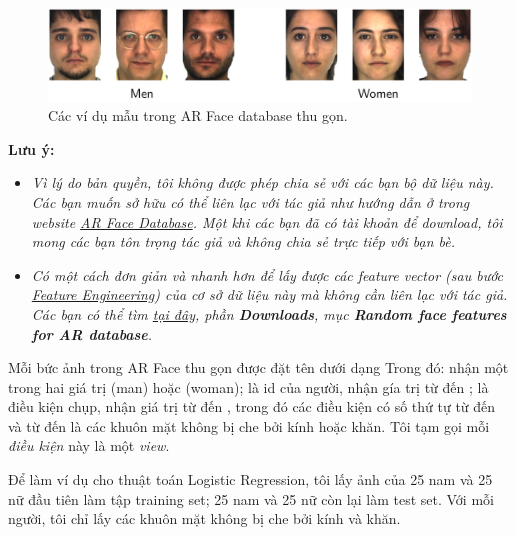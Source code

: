 \begin{figure}[t]
\centering
    \includegraphics[width = \textwidth]{Chapters/05_NeuralNetworks/12_binaryclassifiers/ARgender.png}
    \caption[]{Các ví dụ mẫu trong AR Face database thu gọn.}
    \label{fig:12_1}
\end{figure}
\textbf{Lưu ý:} 
\begin{itemize}
\item \textit{Vì lý do bản quyền, tôi không được phép chia sẻ với các bạn bộ dữ liệu này. Các bạn muốn sở hữu có thể liên lạc với tác giả như hướng dẫn ở trong website \href{http://www2.ece.ohio-state.edu/~aleix/ARdatabase.html}{AR Face Database}. Một khi các bạn đã có tài khoản để download, tôi mong các bạn tôn trọng tác giả và không chia sẻ trực tiếp với bạn bè.} 
 
\item \textit{Có một cách đơn giản và nhanh hơn để lấy được các feature vector (sau bước \href{http://machinelearningcoban.com/general/2017/02/06/featureengineering/}{Feature Engineering})  của cơ sở dữ liệu này mà không cần liên lạc với tác giả. Các bạn có thể tìm  \href{https://www.umiacs.umd.edu/~zhuolin/projectlcksvd.html}{tại đây}, phần \textbf{Downloads}, mục \textbf{Random face features for AR database}.} 
\end{itemize}
 
Mỗi bức ảnh trong AR Face thu gọn được đặt tên dưới dạng  Trong đó:  nhận một trong hai giá trị  (man) hoặc  (woman);  là id của người, nhận gía trị từ  đến ;  là điều kiện chụp, nhận giá trị từ  đến , trong đó các điều kiện có số thứ tự từ  đến  và từ  đến  là các khuôn mặt không bị che bởi kính hoặc khăn. Tôi tạm gọi mỗi \textit{điều kiện} này là một \textit{view}. 
 
Để làm ví dụ cho thuật toán Logistic Regression, tôi lấy ảnh của 25 nam và 25 nữ đầu tiên làm tập training set; 25 nam và 25 nữ còn lại làm test set. Với mỗi người, tôi chỉ lấy các khuôn mặt không bị che bởi kính và khăn. 
 

